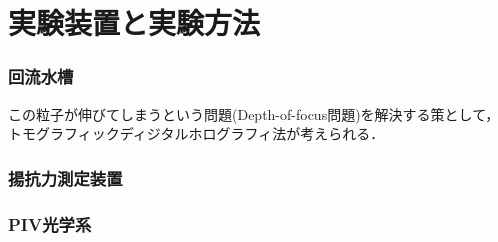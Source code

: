 \section{実験装置と実験方法}
\subsubsection{回流水槽}
この粒子が伸びてしまうという問題(Depth-of-focus問題)を解決する策として，トモグラフィックディジタルホログラフィ法が考えられる．

\subsubsection{揚抗力測定装置}

\subsubsection{PIV光学系}


